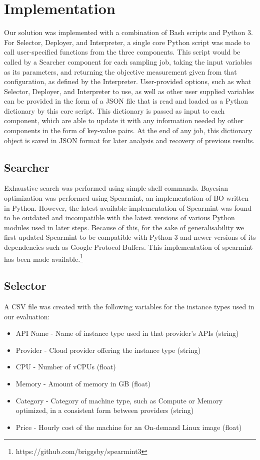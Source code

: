 \documentclass{article}
\begin{document}
\section{Implementation}
Our solution was implemented with a combination of Bash scripts and Python 3. For Selector, Deployer, and Interpreter, a single core Python script was made to call user-specified functions from the three components. This script would be called by a Searcher component for each sampling job, taking the input variables as its parameters, and returning the objective measurement given from that configuration, as defined by the Interpreter. User-provided options, such as what Selector, Deployer, and Interpreter to use, as well as other user supplied variables can be provided in the form of a JSON file that is read and loaded as a Python dictionary by this core script. This dictionary is passed as input to each component, which are able to update it with any information needed by other components in the form of key-value pairs. At the end of any job, this dictionary object is saved in JSON format for later analysis and recovery of previous results.

\subsection{Searcher}
Exhaustive search was performed using simple shell commands. Bayesian optimization was performed using Spearmint, an implementation of BO written in Python. However, the latest available implementation of Spearmint was found to be outdated and incompatible with the latest versions of various Python modules used in later steps. 
Because of this, for the sake of generalisability we first updated Spearmint to be compatible with Python 3 and newer versions of its dependencies such as Google Protocol Buffers. This implementation of spearmint has been made available.\footnote{https://github.com/briggsby/spearmint3}

\subsection{Selector}
A CSV file was created with the following variables for the instance types used in our evaluation:

\begin{itemize}
\item API Name - Name of instance type used in that provider's APIs (string)
\item Provider - Cloud provider offering the instance type (string)
\item CPU - Number of vCPUs (float)
\item Memory - Amount of memory in GB (float)
\item Category - Category of machine type, such as Compute or Memory optimized, in a consistent form between providers (string) 	
\item Price - Hourly cost of the machine for an On-demand Linux image (float)
\end{itemize}
\end{document}
